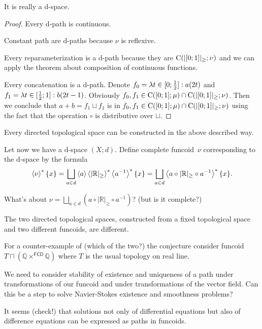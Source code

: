 \begin{prop}
It is really a $\mathrm{d}$-space.
\end{prop}

\begin{proof}
Every $\mathrm{d}$-path is continuous.

Constant path are $\mathrm{d}$-paths because $\nu$ is reflexive.

Every reparameterization is a $\mathrm{d}$-path because they are $\mathrm{C}(|[0;1]|_{\geq}; \nu)$ and we can apply the theorem about
composition of continuous functions.

Every concatenation is a $\mathrm{d}$-path. Denote
$f_0 = \lambda t\in[0;\frac{1}{2}]:a(2t)$ and $f_1 = \lambda t\in[\frac{1}{2};1]:b(2t-1)$.
Obviously $f_0,f_1 \in \mathrm{C}([0;1];\mu) \cap \mathrm{C}(|[0;1]|_{\geq}; \nu)$.
Then we conclude that $a+b = f_1\sqcup f_1$ is in $f_0,f_1 \in \mathrm{C}([0;1];\mu) \cap \mathrm{C}(|[0;1]|_{\geq}; \nu)$
using the fact that the operation $\circ$ is distributive over $\sqcup$.
\end{proof}

\begin{conjecture}
Every directed topological space can be constructed in the above described way.
\end{conjecture}

Let now we have a $\mathrm{d}$-space $(X;d)$. Define complete funcoid~$\nu$ corresponding to the $\mathrm{d}$-space by the formula
\[ \rsupfun{\nu}\{x\} = \bigsqcup_{a\in d}\supfun{a}\rsupfun{|\mathbb{R}|_{\geq}}\rsupfun{a^{-1}}\{x\} =
\bigsqcup_{a\in d}\rsupfun{a\circ |\mathbb{R}|_{\geq}\circ a^{-1}}\{x\}. \]

What's about $\nu = \bigsqcup_{a\in d}(a\circ |\mathbb{R}|_{\geq}\circ a^{-1})$? (but is it complete?)

\begin{conjecture}
The two directed topological spaces, constructed from a fixed topological space and two different funcoids,
are different.
\end{conjecture}

For a counter-example of (which of the two?) the conjecture consider funcoid $T\sqcap(\mathbb{Q}\times^{\mathsf{FCD}}\mathbb{Q})$
where $T$ is the usual topology on real line.

We need to consider stability of existence and uniqueness of a path under transformations of our funcoid and
under transformations of the vector field. Can this be a step to solve Navier-Stokes existence and smoothness problems?

It seems (check!) that solutions not only of differential equations but also of difference equations can be
expressed as paths in funcoids.
